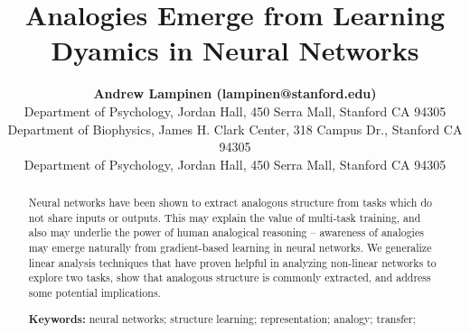 \documentclass[10pt,letterpaper]{article}
\title{Analogies Emerge from Learning Dyamics in Neural Networks}
\author{{\large \bf Andrew Lampinen (lampinen@stanford.edu)} \\
  Department of Psychology, Jordan Hall, 450 Serra Mall, Stanford CA 94305 
  \AND {\large \bf Shaw Hsu (cshawhsu@stanford.edu)} \\
  Department of Biophysics, James H. Clark Center, 318 Campus Dr., Stanford CA 94305
  \AND {\large \bf James L. McClelland (mcclelland@stanford.edu)} \\
  Department of Psychology, Jordan Hall, 450 Serra Mall, Stanford CA 94305}
\begin{document}
\maketitle


\begin{abstract}
Neural networks have been shown to extract analogous structure from tasks which do not share inputs or outputs. This may explain the value of multi-task training, and also may underlie the power of human analogical reasoning -- awareness of analogies may emerge naturally from gradient-based learning in neural networks. We generalize linear analysis techniques that have proven helpful in analyzing non-linear networks to explore two tasks, show that analogous structure is commonly extracted, and address some potential implications. 

\textbf{Keywords:} 
neural networks; structure learning; representation; analogy; transfer; 
\end{abstract}
\end{document}
